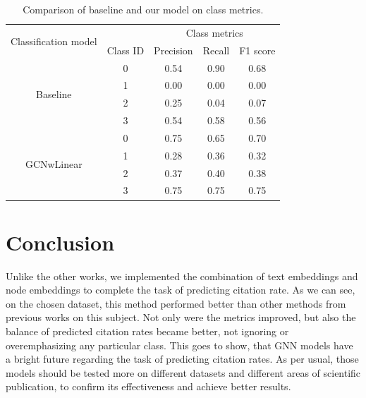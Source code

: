 \documentclass{article}
\newcommand\tab[1][1cm]{\hspace*{#1}}
\begin{document}
\begin{table}[h]
\centering
\begin{tabular}{c | c c c c}
\hline\hline

\multirow{2}{*}{Classification model} & & \multicolumn{3}{c}{Class metrics} \\ 
& Class ID & Precision & Recall & F1 score \\
\hline
\multirow{4}{*}{Baseline}
 & 0 & 0.54 & 0.90 & 0.68 \\
 & 1 & 0.00 & 0.00 & 0.00 \\
 & 2 & 0.25 & 0.04 & 0.07 \\
 & 3 & 0.54 & 0.58 & 0.56 \\
\hline
\multirow{4}{*}{GCNwLinear}
 & 0 & 0.75 & 0.65 & 0.70 \\
 & 1 & 0.28 & 0.36 & 0.32 \\
 & 2 & 0.37 & 0.40 & 0.38 \\
 & 3 & 0.75 & 0.75 & 0.75 \\
\end{tabular}
\caption{Comparison of baseline and our model on class metrics.}
\label{table:class_metrics}
\end{table}

\section{Conclusion}
\tab Unlike the other works, we implemented the combination of text embeddings and node embeddings to complete the task of predicting citation rate. As we can see, on the chosen dataset, this method performed better than other methods from previous works on this subject. Not only were the metrics improved, but also the balance of predicted citation rates became better, not ignoring or overemphasizing any particular class. This goes to show, that GNN models have a bright future regarding the task of predicting citation rates.
As per usual, those models should be tested more on different datasets and different areas of scientific publication, to confirm its effectiveness and achieve better results.
\end{document}
